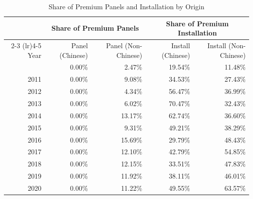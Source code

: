 \begin{table}[!t]
\caption*{
{\large Share of Premium Panels and Installation by Origin}
} 
\fontsize{12.0pt}{14.4pt}\selectfont
\begin{tabular*}{\linewidth}{@{\extracolsep{\fill}}rrrrr}
\toprule
 & \multicolumn{2}{c}{Share of Premium Panels} & \multicolumn{2}{c}{Share of Premium Installation} \\ 
\cmidrule(lr){2-3} \cmidrule(lr){4-5}
Year & Panel (Chinese) & Panel (Non-Chinese) & Install (Chinese) & Install (Non-Chinese) \\ 
\midrule\addlinespace[2.5pt]
2010 & 0.00\% & 2.47\% & 19.54\% & 11.48\% \\ 
2011 & 0.00\% & 9.08\% & 34.53\% & 27.43\% \\ 
2012 & 0.00\% & 4.34\% & 56.47\% & 36.99\% \\ 
2013 & 0.00\% & 6.02\% & 70.47\% & 32.43\% \\ 
2014 & 0.00\% & 13.17\% & 62.74\% & 36.60\% \\ 
2015 & 0.00\% & 9.31\% & 49.21\% & 38.29\% \\ 
2016 & 0.00\% & 15.69\% & 29.79\% & 48.43\% \\ 
2017 & 0.00\% & 12.10\% & 42.79\% & 54.85\% \\ 
2018 & 0.00\% & 12.15\% & 33.51\% & 47.83\% \\ 
2019 & 0.00\% & 11.92\% & 38.11\% & 46.01\% \\ 
2020 & 0.00\% & 11.22\% & 49.55\% & 63.57\% \\ 
\bottomrule
\end{tabular*}
\end{table}

